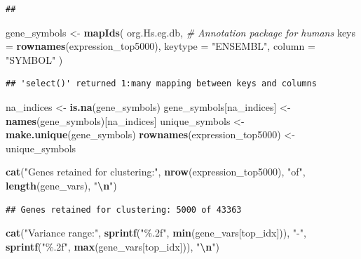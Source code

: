 \documentclass[
]{article}
\newenvironment{Shaded}{\begin{snugshade}}{\end{snugshade}}
\newcommand{\AttributeTok}[1]{\textcolor[rgb]{0.13,0.29,0.53}{#1}}
\newcommand{\CommentTok}[1]{\textcolor[rgb]{0.56,0.35,0.01}{\textit{#1}}}
\newcommand{\FunctionTok}[1]{\textcolor[rgb]{0.13,0.29,0.53}{\textbf{#1}}}
\newcommand{\NormalTok}[1]{#1}
\newcommand{\OtherTok}[1]{\textcolor[rgb]{0.56,0.35,0.01}{#1}}
\newcommand{\SpecialCharTok}[1]{\textcolor[rgb]{0.81,0.36,0.00}{\textbf{#1}}}
\newcommand{\StringTok}[1]{\textcolor[rgb]{0.31,0.60,0.02}{#1}}
\begin{document}
\begin{verbatim}
## 
\end{verbatim}

\begin{Shaded}
\begin{Highlighting}[]
\NormalTok{gene\_symbols }\OtherTok{\textless{}{-}} \FunctionTok{mapIds}\NormalTok{(}
\NormalTok{  org.Hs.eg.db, }\CommentTok{\# Annotation package for humans}
  \AttributeTok{keys =} \FunctionTok{rownames}\NormalTok{(expression\_top5000),}
  \AttributeTok{keytype =} \StringTok{"ENSEMBL"}\NormalTok{,}
  \AttributeTok{column =} \StringTok{"SYMBOL"}
\NormalTok{  )}
\end{Highlighting}
\end{Shaded}

\begin{verbatim}
## 'select()' returned 1:many mapping between keys and columns
\end{verbatim}

\begin{Shaded}
\begin{Highlighting}[]
\NormalTok{na\_indices }\OtherTok{\textless{}{-}} \FunctionTok{is.na}\NormalTok{(gene\_symbols)}
\NormalTok{gene\_symbols[na\_indices] }\OtherTok{\textless{}{-}} \FunctionTok{names}\NormalTok{(gene\_symbols)[na\_indices]}
\NormalTok{unique\_symbols }\OtherTok{\textless{}{-}} \FunctionTok{make.unique}\NormalTok{(gene\_symbols)}
\FunctionTok{rownames}\NormalTok{(expression\_top5000) }\OtherTok{\textless{}{-}}\NormalTok{ unique\_symbols}

\FunctionTok{cat}\NormalTok{(}\StringTok{"Genes retained for clustering:"}\NormalTok{, }\FunctionTok{nrow}\NormalTok{(expression\_top5000), }\StringTok{"of"}\NormalTok{, }\FunctionTok{length}\NormalTok{(gene\_vars), }\StringTok{"}\SpecialCharTok{\textbackslash{}n}\StringTok{"}\NormalTok{)}
\end{Highlighting}
\end{Shaded}

\begin{verbatim}
## Genes retained for clustering: 5000 of 43363
\end{verbatim}

\begin{Shaded}
\begin{Highlighting}[]
\FunctionTok{cat}\NormalTok{(}\StringTok{"Variance range:"}\NormalTok{, }\FunctionTok{sprintf}\NormalTok{(}\StringTok{"\%.2f"}\NormalTok{, }\FunctionTok{min}\NormalTok{(gene\_vars[top\_idx])), }\StringTok{"{-}"}\NormalTok{, }\FunctionTok{sprintf}\NormalTok{(}\StringTok{"\%.2f"}\NormalTok{, }\FunctionTok{max}\NormalTok{(gene\_vars[top\_idx])), }\StringTok{"}\SpecialCharTok{\textbackslash{}n}\StringTok{"}\NormalTok{)}
\end{Highlighting}
\end{Shaded}
\end{document}
